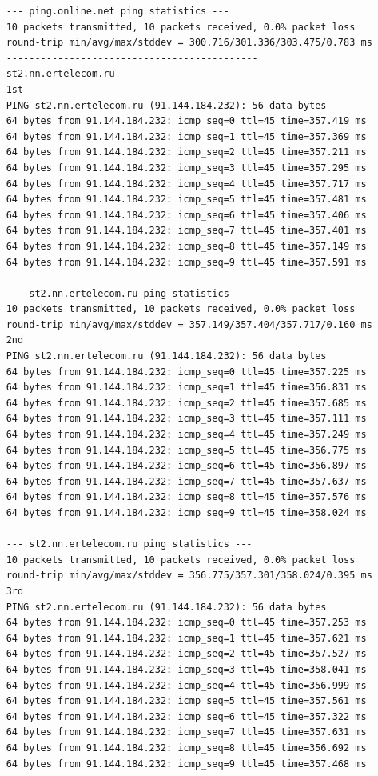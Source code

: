 \documentclass[paper=a4, fontsize=10pt]{scrartcl} %
\numberwithin{equation}{section} %
\numberwithin{figure}{section} %
\numberwithin{table}{section} %
\begin{document}
\begin{lstlisting}
    --- ping.online.net ping statistics ---
    10 packets transmitted, 10 packets received, 0.0% packet loss
    round-trip min/avg/max/stddev = 300.716/301.336/303.475/0.783 ms
    --------------------------------------------
    st2.nn.ertelecom.ru
    1st
    PING st2.nn.ertelecom.ru (91.144.184.232): 56 data bytes
    64 bytes from 91.144.184.232: icmp_seq=0 ttl=45 time=357.419 ms
    64 bytes from 91.144.184.232: icmp_seq=1 ttl=45 time=357.369 ms
    64 bytes from 91.144.184.232: icmp_seq=2 ttl=45 time=357.211 ms
    64 bytes from 91.144.184.232: icmp_seq=3 ttl=45 time=357.295 ms
    64 bytes from 91.144.184.232: icmp_seq=4 ttl=45 time=357.717 ms
    64 bytes from 91.144.184.232: icmp_seq=5 ttl=45 time=357.481 ms
    64 bytes from 91.144.184.232: icmp_seq=6 ttl=45 time=357.406 ms
    64 bytes from 91.144.184.232: icmp_seq=7 ttl=45 time=357.401 ms
    64 bytes from 91.144.184.232: icmp_seq=8 ttl=45 time=357.149 ms
    64 bytes from 91.144.184.232: icmp_seq=9 ttl=45 time=357.591 ms
    
    --- st2.nn.ertelecom.ru ping statistics ---
    10 packets transmitted, 10 packets received, 0.0% packet loss
    round-trip min/avg/max/stddev = 357.149/357.404/357.717/0.160 ms
    2nd
    PING st2.nn.ertelecom.ru (91.144.184.232): 56 data bytes
    64 bytes from 91.144.184.232: icmp_seq=0 ttl=45 time=357.225 ms
    64 bytes from 91.144.184.232: icmp_seq=1 ttl=45 time=356.831 ms
    64 bytes from 91.144.184.232: icmp_seq=2 ttl=45 time=357.685 ms
    64 bytes from 91.144.184.232: icmp_seq=3 ttl=45 time=357.111 ms
    64 bytes from 91.144.184.232: icmp_seq=4 ttl=45 time=357.249 ms
    64 bytes from 91.144.184.232: icmp_seq=5 ttl=45 time=356.775 ms
    64 bytes from 91.144.184.232: icmp_seq=6 ttl=45 time=356.897 ms
    64 bytes from 91.144.184.232: icmp_seq=7 ttl=45 time=357.637 ms
    64 bytes from 91.144.184.232: icmp_seq=8 ttl=45 time=357.576 ms
    64 bytes from 91.144.184.232: icmp_seq=9 ttl=45 time=358.024 ms
    
    --- st2.nn.ertelecom.ru ping statistics ---
    10 packets transmitted, 10 packets received, 0.0% packet loss
    round-trip min/avg/max/stddev = 356.775/357.301/358.024/0.395 ms
    3rd
    PING st2.nn.ertelecom.ru (91.144.184.232): 56 data bytes
    64 bytes from 91.144.184.232: icmp_seq=0 ttl=45 time=357.253 ms
    64 bytes from 91.144.184.232: icmp_seq=1 ttl=45 time=357.621 ms
    64 bytes from 91.144.184.232: icmp_seq=2 ttl=45 time=357.527 ms
    64 bytes from 91.144.184.232: icmp_seq=3 ttl=45 time=358.041 ms
    64 bytes from 91.144.184.232: icmp_seq=4 ttl=45 time=356.999 ms
    64 bytes from 91.144.184.232: icmp_seq=5 ttl=45 time=357.561 ms
    64 bytes from 91.144.184.232: icmp_seq=6 ttl=45 time=357.322 ms
    64 bytes from 91.144.184.232: icmp_seq=7 ttl=45 time=357.631 ms
    64 bytes from 91.144.184.232: icmp_seq=8 ttl=45 time=356.692 ms
    64 bytes from 91.144.184.232: icmp_seq=9 ttl=45 time=357.468 ms
    

\end{lstlisting}
\end{document}
